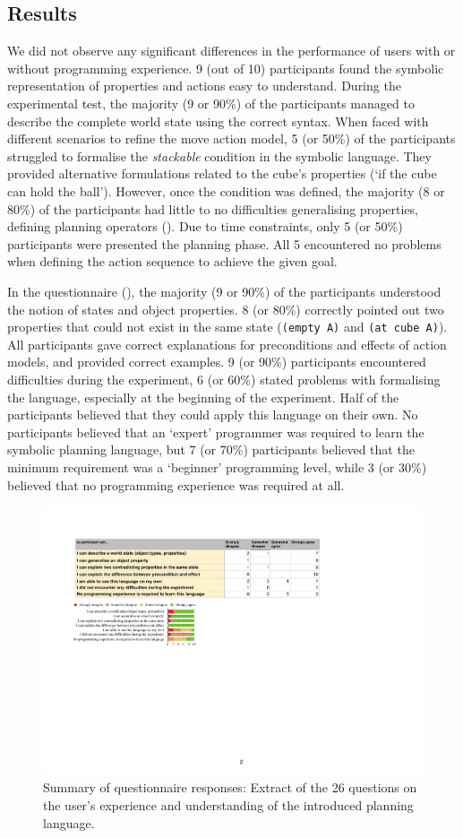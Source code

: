 \subsection{Results}
We did not observe any significant differences in the performance of users with or without programming experience.
9 (out of 10) participants found the symbolic representation of properties and actions easy to understand.
During the experimental test, the majority (9 or 90\%) of the participants managed to describe the complete world state using the correct syntax.
When faced with different scenarios to refine the move action model, 5 (or 50\%) of the participants struggled to formalise the \textit{stackable} condition in the symbolic language.
They provided alternative formulations related to the cube's properties (\eg `if the cube can hold the ball').
However, once the condition was defined, the majority (8 or 80\%) of the participants had little to no difficulties generalising properties, \eg defining planning operators ().
Due to time constraints, only 5 (or 50\%) participants were presented the planning phase.
All 5 encountered no problems when defining the action sequence to achieve the given goal.

In the questionnaire (), the majority (9 or 90\%) of the participants understood the notion of states and object properties.
8 (or 80\%) correctly pointed out two properties that could not exist in the same state (\eg \texttt{(empty A)} and \texttt{(at cube A)}).
All participants gave correct explanations for preconditions and effects of action models, and provided correct examples.
9 (or 90\%) participants encountered difficulties during the experiment, 6 (or 60\%) stated problems with formalising the language, especially at the beginning of the experiment.
Half of the participants believed that they could apply this language on their own.
No participants believed that an `expert' programmer was required to learn the symbolic planning language, but 7 (or 70\%) participants believed that the minimum requirement was a `beginner' programming level, while 3 (or 30\%) believed that no programming experience was required at all.


\begin{figure}[ht]
	\centering
	\includegraphics[width=0.85\linewidth]{figures/eEvaluation2}
	\caption{Summary of questionnaire responses: Extract of the 26 questions on the user's experience and understanding of the introduced planning language.}
	\label{fig:eEvaluation2}
\end{figure} 